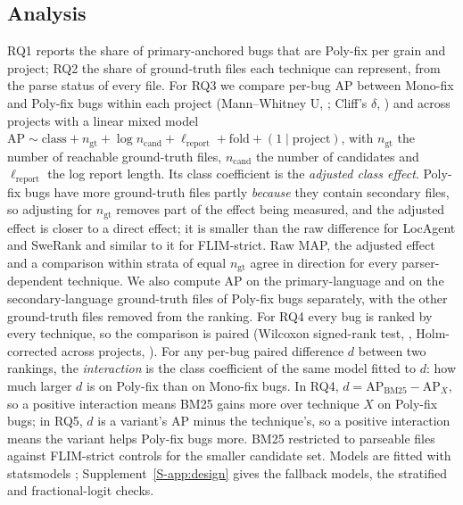 \documentclass[a4paper,fleqn]{cas-dc}
\begin{document}
\subsection{Analysis}\label{sec:analysis}

RQ1 reports the share of primary-anchored bugs that are Poly-fix per grain and
project; RQ2 the share of ground-truth files each technique can represent,
from the parse status of every file. For RQ3 we compare per-bug AP between
Mono-fix and Poly-fix bugs within each project (Mann--Whitney U,
\citealp{mann1947test}; Cliff's $\delta$, \citealp{cliff1993dominance}) and
across projects with a linear mixed model
$\mathrm{AP} \sim \mathrm{class} + n_{\mathrm{gt}} + \log n_{\mathrm{cand}} +
\ell_{\mathrm{report}} + \mathrm{fold} + (1 \mid \mathrm{project})$, with
$n_{\mathrm{gt}}$ the number of reachable ground-truth files,
$n_{\mathrm{cand}}$ the number of candidates and $\ell_{\mathrm{report}}$ the
log report length. Its class coefficient is the \emph{adjusted class effect}.
Poly-fix bugs have more ground-truth files partly \emph{because} they contain
secondary files, so adjusting for $n_{\mathrm{gt}}$ removes part of the effect
being measured, and the adjusted effect is closer to a direct effect; it is
smaller than the raw difference for LocAgent and SweRank and similar to it for
FLIM-strict. Raw MAP, the adjusted effect and a comparison within strata of
equal $n_{\mathrm{gt}}$ agree in direction for every parser-dependent
technique. We also compute AP on the primary-language and on the secondary-language
ground-truth files of Poly-fix bugs separately, with the other ground-truth
files removed from the ranking. For RQ4 every bug is ranked by every
technique, so the comparison is paired (Wilcoxon signed-rank test,
\citealp{wilcoxon1945}, Holm-corrected across projects,
\citealp{holm1979simple}). For any per-bug paired difference $d$ between two
rankings, the \emph{interaction} is the class coefficient of the same model
fitted to $d$: how much larger $d$ is on Poly-fix than on Mono-fix bugs. In
RQ4, $d = \mathrm{AP}_{\mathrm{BM25}} - \mathrm{AP}_{X}$, so a positive
interaction means BM25 gains more over technique $X$ on Poly-fix bugs; in RQ5,
$d$ is a variant's AP minus the technique's, so a positive interaction means
the variant helps Poly-fix bugs more. BM25 restricted to parseable files against
FLIM-strict controls for the smaller candidate set. Models are fitted with
statsmodels \citep{seabold2010statsmodels}; Supplement~\ref{S-app:design} gives
the fallback models, the stratified and fractional-logit checks.
\end{document}
